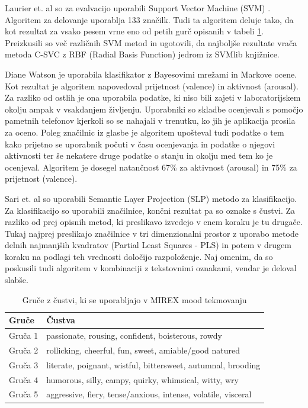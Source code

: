 \documentclass[a4paper, 12pt]{book}
\begin{document}
{Laurier et. al \cite{laurier2007audio} so za evalvacijo uporabili Support Vector Machine (SVM) \cite{ben2010user}. Algoritem za delovanje uporablja 133 značilk. Tudi ta algoritem deluje tako, da kot rezultat za vsako pesem vrne eno od petih gurč opisanih v tabeli \ref{mirextask}. Preizkusili so več različnih SVM metod in ugotovili, da najboljše rezultate vrača metoda C-SVC z RBF (Radial Basis Function) jedrom iz SVMlib knjižnice. 

Diane Watson \cite{watson2012modeling} je uporabila klasifikator z Bayesovimi mrežami in Markove ocene. Kot rezultat je algoritem napovedoval prijetnost (valence) in aktivnost (arousal). Za razliko od ostlih je ona uporabila podatke, ki niso bili zajeti v laboratorijskem okolju ampak v vsakdanjem življenju. Uporabniki so skladbe ocenjevali s pomočjo pametnih telefonov kjerkoli so se nahajali v trenutku, ko jih je aplikacija prosila za oceno. Poleg značilnic iz glasbe je algoritem upošteval tudi podatke o tem kako prijetno se uporabnik počuti v času ocenjevanja in podatke o njegovi aktivnosti ter še nekatere druge podatke o stanju in okolju med tem ko je ocenjeval. Algoritem je dosegel natančnost 67\% za aktivnost (arousal) in 75\% za prijetnost (valence). 

Sari et. al \cite{saari2013role} so uporabili Semantic Layer Projection (SLP) metodo za klasifikacijo. Za klasifikacijo so uporabili značilnice, končni rezultat pa so oznake s čustvi. Za razliko od prej opisnih metod, ki preslikavo izvedejo v enem koraku je tu drugače. Tukaj najprej preslikajo značilnice v tri dimenzionalni prostor z uporabo metode delnih najmanjših kvadratov (Partial Least Squares - PLS) in potem v drugem koraku na podlagi teh vrednosti določijo razpoloženje. Naj omenim, da so poskusili tudi algoritem v kombinaciji z tekstovnimi oznakami, vendar je deloval slabše. 


\begin{table}[htb]
	\caption{Gruče z čustvi, ki se uporabljajo v MIREX mood tekmovanju}
    \begin{tabular}{|l|l|}
    \hline
    Gruče   & Čustva  \\
    \hline                                                      
    Gruča 1 & passionate, rousing, confident, boisterous, rowdy             \\
    Gruča 2 & rollicking, cheerful, fun, sweet, amiable/good natured        \\
    Gruča 3 & literate, poignant, wistful, bittersweet, autumnal, brooding  \\
    Gruča 4 & humorous, silly, campy, quirky, whimsical, witty, wry         \\
    Gruča 5 & aggressive, fiery, tense/anxious, intense, volatile, visceral \\
    \hline
    \end{tabular} 
    \label{mirextask}   
\end{table}

}
\end{document}

